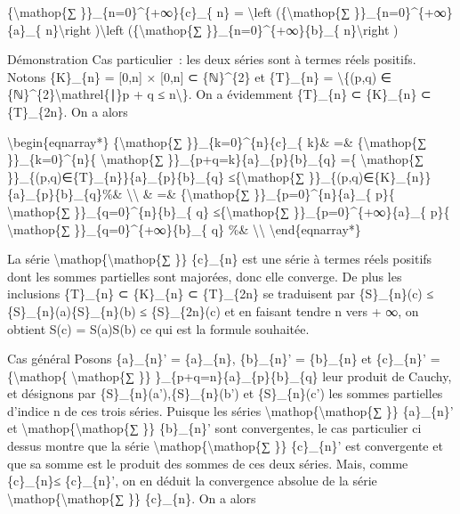 \documentclass[]{article}
\begin{document}
\{\textbackslash{}mathop\{∑ \}\}\_\{n=0\}\^{}\{+∞\}\{c\}\_\{ n\} =
\textbackslash{}left (\{\textbackslash{}mathop\{∑
\}\}\_\{n=0\}\^{}\{+∞\}\{a\}\_\{ n\}\textbackslash{}right
)\textbackslash{}left (\{\textbackslash{}mathop\{∑
\}\}\_\{n=0\}\^{}\{+∞\}\{b\}\_\{ n\}\textbackslash{}right )

Démonstration Cas particulier~: les deux séries sont à termes réels
positifs. Notons \{K\}\_\{n\} = {[}0,n{]} × {[}0,n{]} ⊂ \{ℕ\}\^{}\{2\}
et \{T\}\_\{n\} = \textbackslash{}\{(p,q) ∈
\{ℕ\}\^{}\{2\}\textbackslash{}mathrel\{∣\}p + q ≤ n\textbackslash{}\}.
On a évidemment \{T\}\_\{n\} ⊂ \{K\}\_\{n\} ⊂ \{T\}\_\{2n\}. On a alors

\textbackslash{}begin\{eqnarray*\} \{\textbackslash{}mathop\{∑
\}\}\_\{k=0\}\^{}\{n\}\{c\}\_\{ k\}\& =\& \{\textbackslash{}mathop\{∑
\}\}\_\{k=0\}\^{}\{n\}\{ \textbackslash{}mathop\{∑
\}\}\_\{p+q=k\}\{a\}\_\{p\}\{b\}\_\{q\} =\{ \textbackslash{}mathop\{∑
\}\}\_\{(p,q)∈\{T\}\_\{n\}\}\{a\}\_\{p\}\{b\}\_\{q\}
≤\{\textbackslash{}mathop\{∑
\}\}\_\{(p,q)∈\{K\}\_\{n\}\}\{a\}\_\{p\}\{b\}\_\{q\}\%\&
\textbackslash{}\textbackslash{} \& =\& \{\textbackslash{}mathop\{∑
\}\}\_\{p=0\}\^{}\{n\}\{a\}\_\{ p\}\{ \textbackslash{}mathop\{∑
\}\}\_\{q=0\}\^{}\{n\}\{b\}\_\{ q\} ≤\{\textbackslash{}mathop\{∑
\}\}\_\{p=0\}\^{}\{+∞\}\{a\}\_\{ p\}\{ \textbackslash{}mathop\{∑
\}\}\_\{q=0\}\^{}\{+∞\}\{b\}\_\{ q\} \%\&
\textbackslash{}\textbackslash{} \textbackslash{}end\{eqnarray*\}

La série \textbackslash{}mathop\{\textbackslash{}mathop\{∑ \}\}
\{c\}\_\{n\} est une série à termes réels positifs dont les sommes
partielles sont majorées, donc elle converge. De plus les inclusions
\{T\}\_\{n\} ⊂ \{K\}\_\{n\} ⊂ \{T\}\_\{2n\} se traduisent par
\{S\}\_\{n\}(c) ≤ \{S\}\_\{n\}(a)\{S\}\_\{n\}(b) ≤ \{S\}\_\{2n\}(c) et
en faisant tendre n vers + ∞, on obtient S(c) = S(a)S(b) ce qui est la
formule souhaitée.

Cas général Posons \{a\}\_\{n\}' = \textbar{}\{a\}\_\{n\}\textbar{},
\{b\}\_\{n\}' = \textbar{}\{b\}\_\{n\}\textbar{} et \{c\}\_\{n\}'
=\{\textbackslash{}mathop\{ \textbackslash{}mathop\{∑ \}\}
\}\_\{p+q=n\}\textbar{}\{a\}\_\{p\}\textbar{}\textbar{}\{b\}\_\{q\}\textbar{}
leur produit de Cauchy, et désignons par
\{S\}\_\{n\}(a'),\{S\}\_\{n\}(b') et \{S\}\_\{n\}(c') les sommes
partielles d'indice n de ces trois séries. Puisque les séries
\textbackslash{}mathop\{\textbackslash{}mathop\{∑ \}\} \{a\}\_\{n\}' et
\textbackslash{}mathop\{\textbackslash{}mathop\{∑ \}\} \{b\}\_\{n\}'
sont convergentes, le cas particulier ci dessus montre que la série
\textbackslash{}mathop\{\textbackslash{}mathop\{∑ \}\} \{c\}\_\{n\}' est
convergente et que sa somme est le produit des sommes de ces deux
séries. Mais, comme \textbar{}\{c\}\_\{n\}\textbar{}≤ \{c\}\_\{n\}', on
en déduit la convergence absolue de la série
\textbackslash{}mathop\{\textbackslash{}mathop\{∑ \}\} \{c\}\_\{n\}. On
a alors
\end{document}
